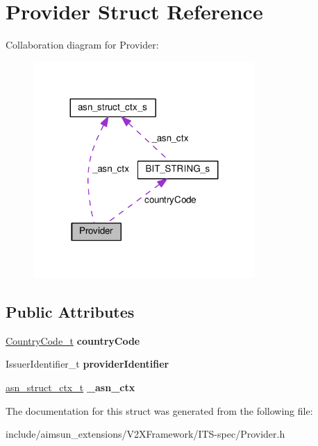 \hypertarget{structProvider}{}\section{Provider Struct Reference}
\label{structProvider}


Collaboration diagram for Provider\+:\nopagebreak
\begin{figure}[H]
\begin{center}
\leavevmode
\includegraphics[width=239pt]{structProvider__coll__graph}
\end{center}
\end{figure}
\subsection*{Public Attributes}
\begin{DoxyCompactItemize}
\item 
\hyperlink{structBIT__STRING__s}{Country\+Code\+\_\+t} {\bfseries country\+Code}\hypertarget{structProvider_ab5bee403870d8001259733ee622018cd}{}\label{structProvider_ab5bee403870d8001259733ee622018cd}

\item 
Issuer\+Identifier\+\_\+t {\bfseries provider\+Identifier}\hypertarget{structProvider_a8b252839d451a6a51b8bcb4338f4357f}{}\label{structProvider_a8b252839d451a6a51b8bcb4338f4357f}

\item 
\hyperlink{structasn__struct__ctx__s}{asn\+\_\+struct\+\_\+ctx\+\_\+t} {\bfseries \+\_\+asn\+\_\+ctx}\hypertarget{structProvider_a6496566994cb0d91c77ae18c8f1388de}{}\label{structProvider_a6496566994cb0d91c77ae18c8f1388de}

\end{DoxyCompactItemize}


The documentation for this struct was generated from the following file\+:\begin{DoxyCompactItemize}
\item 
include/aimsun\+\_\+extensions/\+V2\+X\+Framework/\+I\+T\+S-\/spec/Provider.\+h\end{DoxyCompactItemize}
